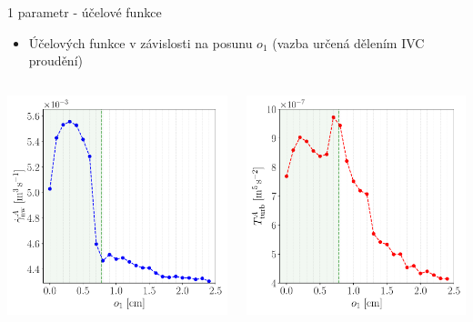 \documentclass[aspectratio=169,xcolor=dvipsnames]{beamer}
\begin{document}
\begin{frame}{1 parametr - účelové funkce}
	\begin{itemize}
		\item Účelových funkce v závislosti na posunu $o_1$ (vazba určená dělením IVC proudění)
	\end{itemize}
	\begin{columns}
		\begin{column}{.5\textwidth}
			\includegraphics[width=0.9\linewidth, trim={0 0 0 0}, clip]{Images/mean_stress_3_interpolated.pdf}			
		\end{column}\hfill%
		\begin{column}{.5\textwidth}
			\includegraphics[width=0.9\linewidth, trim={0 0 0 0}, clip]{Images/mean_turbulence_kinetic_energy_interpolated.pdf}
		\end{column}
	\end{columns}
\end{frame}
\end{document}
